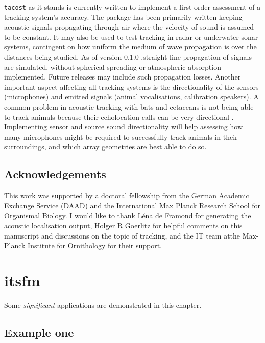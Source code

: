 \documentclass[
]{book}
\begin{document}
\texttt{tacost} as it stands is currently written to implement a first-order assessment of a tracking system's accuracy. The package has been primarily written keeping acoustic signals propagating through air where the velocity of
sound is assumed to be constant. It may also be used to test tracking in radar or underwater sonar systems, contingent on how uniform the medium of wave propagation is over the distances being studied. As of version 0.1.0
,straight line propagation of signals are simulated, without spherical spreading or atmospheric absorption implemented. Future releases may include such propagation losses. Another important aspect affecting all tracking systems
is the directionality of the sensors (microphones) and emitted signals (animal vocalisations, calibration speakers). A common problem in acoustic tracking with bats and cetaceans is not being able to track animals because their echolocation calls can
be very directional \citep{Matsuta2013, Surlykke2012, Koblitz2016}. Implementing sensor and source sound directionality will help assessing how many microphones might be required to successfully track animals in their surroundings, and which array geometries are best able to do so.

\hypertarget{acknowledgements}{%
\section{Acknowledgements}\label{acknowledgements}}

This work was supported by a doctoral fellowship from the German Academic Exchange Service (DAAD) and the International Max Planck Research School for Organismal Biology.
I would like to thank Léna de Framond for generating the acoustic localisation output, Holger R Goerlitz for helpful comments on this manuscript and discussions on the topic of tracking, and the IT team atthe Max-Planck Institute for Ornithology for their support.

\hypertarget{itsfm}{%
\chapter{itsfm}\label{itsfm}}

Some \emph{significant} applications are demonstrated in this chapter.

\hypertarget{example-one}{%
\section{Example one}\label{example-one}}
\end{document}
